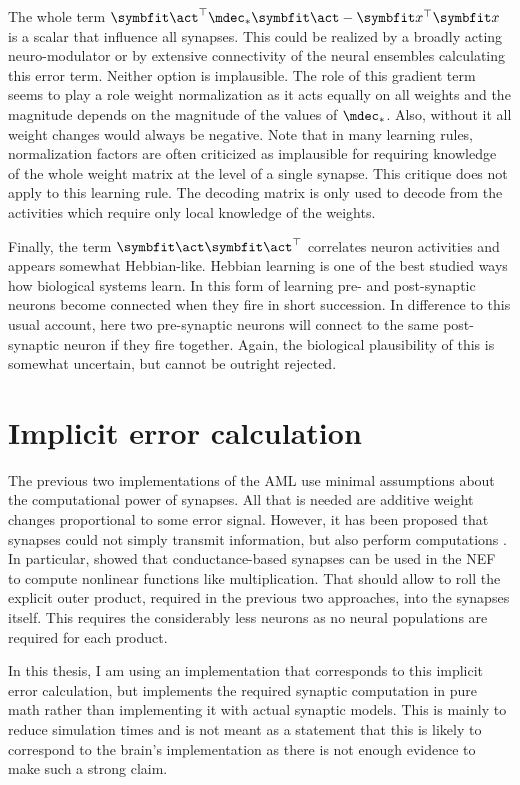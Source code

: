 The whole term $\vc\act\Tr \mdec_* \vc\act - \vc x\Tr \vc x$ is a scalar that influence all synapses.
This could be realized by a broadly acting neuro-modulator or by extensive connectivity of the neural ensembles calculating this error term.
Neither option is implausible.
The role of this gradient term seems to play a role weight normalization as it acts equally on all weights and the magnitude depends on the magnitude of the values of $\mdec_*$.
Also, without it all weight changes would always be negative.
Note that in many learning rules, normalization factors are often criticized as implausible for requiring knowledge of the whole weight matrix at the level of a single synapse.
This critique does not apply to this learning rule.
The decoding matrix is only used to decode from the activities which require only local knowledge of the weights.

Finally, the term $\vc\act \vc\act\Tr$ correlates neuron activities and appears somewhat Hebbian-like.
Hebbian learning is one of the best studied ways how biological systems learn.
In this form of learning pre- and post-synaptic neurons become connected when they fire in short succession.
In difference to this usual account, here two pre-synaptic neurons will connect to the same post-synaptic neuron if they fire together.
Again, the biological plausibility of this is somewhat uncertain, but cannot be outright rejected.


\section{Implicit error calculation}
The previous two implementations of the AML use minimal assumptions about the computational power of synapses.
All that is needed are additive weight changes proportional to some error signal.
However, it has been proposed that synapses could not simply transmit information, but also perform computations \parencites{abbott2004}[Ch.~5]{koch2004}.
In particular, \textcite{andreasstockel2018} showed that conductance-based synapses can be used in the NEF to compute nonlinear functions like multiplication.
That should allow to roll the explicit outer product, required in the previous two approaches, into the synapses itself.
This requires the considerably less neurons as no neural populations are required for each product.

In this thesis, I am using an implementation that corresponds to this implicit error calculation, but implements the required synaptic computation in pure math rather than implementing it with actual synaptic models.
This is mainly to reduce simulation times and is not meant as a statement that this is likely to correspond to the brain's implementation as there is not enough evidence to make such a strong claim.


